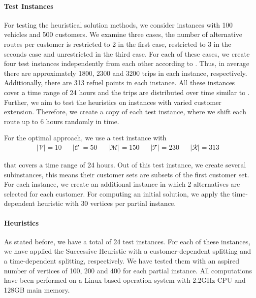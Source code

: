 \paragraph{Test Instances} \parfill

For testing the heuristical solution methods, we consider instances with 100 vehicles and 500 customers. We examine three cases, the number of alternative routes per customer is restricted to 2 in the first case, restricted to 3 in the seconds case and unrestricted in the third case. For each of these cases, we create four test instances independently from each other according to . Thus, in average there are approximately 1800, 2300 and 3200 trips in each instance, respectively. Additionally, there are 313 refuel points in each instance. All these instances cover a time range of 24 hours and the trips are distributed over time similar to . Further, we aim to test the heuristics on instances with varied customer extension. Therefore, we create a copy of each test instance, where we shift each route up to 6 hours randomly in time.

For the optimal approach, we use a test instance with
\begin{align*}
	\vert\mathcal{V}\vert = 10 && \vert\mathcal{C}\vert = 50 && \vert\mathcal{M}\vert = 150 && \vert\mathcal{T}\vert = 230 && \vert\mathcal{R}\vert = 313
\end{align*}

that covers a time range of 24 hours. Out of this test instance, we create several subinstances, this means their customer sets are subsets of the first customer set. For each instance, we create an additional instance in which 2 alternatives are selected for each customer. For computing an initial solution, we apply the time-dependent heuristic with 30 vertices per partial instance.

\paragraph{Heuristics} \parfill

As stated before, we have a total of 24 test instances. For each of these instances, we have applied the Successive Heuristic with a customer-dependent splitting and a time-dependent splitting, respectively. We have tested them with an aspired number of vertices of 100, 200 and 400 for each partial instance. All computations have been performed on a Linux-based operation system with 2.2GHz CPU and 128GB main memory.

